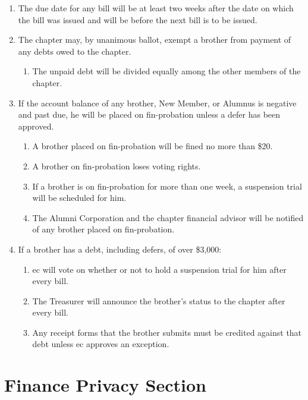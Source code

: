 	\begin{enumerate}
		\item The due date for any bill will be at least two weeks after the date on which the bill was issued and will be before the next bill is to be issued.

		\item The chapter may, by unanimous ballot, exempt a brother from payment of any debts owed to the chapter.
			\begin{enumerate}
				\item The unpaid debt will be divided equally among the other members of the chapter.
			\end{enumerate}

		\item If the account balance of any brother, New Member, or Alumnus is negative and past due, he will be placed on \gls{fin-probation} unless a \gls{defer} has been approved.
		\label{fin-probation}
			\begin{enumerate}
				\item A brother placed on \gls{fin-probation} will be fined no more than \$20.
				\item A brother on \gls{fin-probation} loses voting rights.
				\item If a brother is on \gls{fin-probation} for more than one week, a suspension trial will be scheduled for him.
				\item The Alumni Corporation and the chapter financial advisor will be notified of any brother placed on \gls{fin-probation}.
			\end{enumerate}

		\item If a brother has a debt, including \glspl{defer}, of over \$3,000:
			\begin{enumerate}
				\item \Gls{ec} will vote on whether or not to hold a suspension trial for him after every bill.
				\item The Treasurer will announce the brother's status to the chapter after every bill.
				\item Any receipt forms that the brother submits must be credited against that debt unless \gls{ec} approves an exception.
			\end{enumerate}
            \end{enumerate}
\section{Finance Privacy Section}
	
